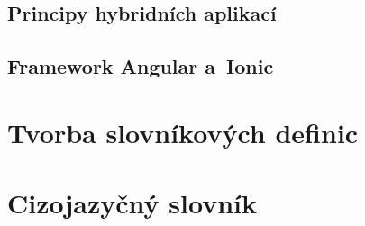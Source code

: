 \hypertarget{principy-hybridnuxedch-aplikacuxed}{%
\subsection{Principy hybridních
aplikací}\label{principy-hybridnuxedch-aplikacuxed}}

\hypertarget{framework-angular-a-ionic}{%
\subsection{Framework Angular
a~Ionic}\label{framework-angular-a-ionic}}

\hypertarget{tvorba-slovnuxedkovuxfdch-definic}{%
\section{Tvorba slovníkových
definic}\label{tvorba-slovnuxedkovuxfdch-definic}}

\hypertarget{cizojazyux10dnuxfd-slovnuxedk}{%
\section{Cizojazyčný slovník}\label{cizojazyux10dnuxfd-slovnuxedk}}
